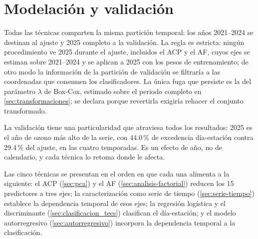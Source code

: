 \section{Modelación y validación}
\label{sec:modelacion}

Todas las técnicas comparten la misma partición temporal: los años
2021--2024 se destinan al ajuste y 2025 completo a la validación. La regla
es estricta: ningún procedimiento ve 2025 durante el ajuste, incluidos el
ACP y el AF, cuyos ejes se estiman sobre 2021--2024 y se aplican a 2025 con
los pesos de entrenamiento; de otro modo la información de la partición de
validación se filtraría a las coordenadas que consumen los clasificadores.
La única fuga que persiste es la del parámetro $\lambda$ de Box-Cox,
estimado sobre el periodo completo en \cref{sec:transformaciones}; se
declara porque revertirla exigiría rehacer el conjunto transformado.

La validación tiene una particularidad que atraviesa todos los resultados:
2025 es el año de ozono más alto de la serie, con 44.0\,\% de excedencia
día-estación contra 29.4\,\% del ajuste, en las cuatro temporadas. Es un
efecto de año, no de calendario, y cada técnica lo retoma donde le afecta.

Las cinco técnicas se presentan en el orden en que cada una alimenta a la
siguiente: el ACP (\cref{sec:pca}) y el AF (\cref{sec:analisis-factorial})
reducen los 15 predictores a tres ejes; la caracterización como serie de
tiempo (\cref{sec:serie-tiempo}) establece la dependencia temporal de esos
ejes; la regresión logística y el discriminante
(\cref{sec:clasificacion_tecs}) clasifican el día-estación; y el modelo
autorregresivo (\cref{sec:autorregresivo}) incorpora la dependencia temporal
a la clasificación.
